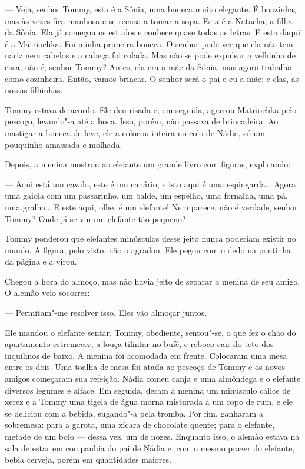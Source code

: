 --- Veja, senhor Tommy, esta é a Sônia, uma boneca muito elegante. É boazinha, mas às vezes fica manhosa e se recusa a tomar a sopa.
Esta é a Natacha, a filha da Sônia. Ela já começou os estudos e conhece
quase todas as letras. E esta daqui é a Matriochka. Foi minha primeira
boneca. O senhor pode ver que ela não tem nariz nem cabelos e a cabeça
foi colada. Mas não se pode expulsar a velhinha de casa, não é, senhor Tommy? Antes, ela era a mãe da Sônia, mas agora trabalha como
cozinheira. Então, vamos brincar. O senhor será o pai e eu a mãe; e
elas, as nossas filhinhas.

Tommy estava de acordo. Ele deu risada e, em seguida, agarrou Matriochka
pelo pescoço, levando"-a até a boca. Isso, porém, não passava de
brincadeira. Ao mastigar a boneca de leve, ele a colocou inteira no colo
de Nádia, só um pouquinho amassada e molhada.

Depois, a menina mostrou ao elefante um grande livro com figuras,
explicando:

--- Aqui está um cavalo, este é um canário, e isto aqui é uma
espingarda\ldots{} Agora uma gaiola com um passarinho, um balde, um espelho,
uma fornalha, uma pá, uma gralha\ldots{} E este aqui, olhe, é um elefante!
Nem parece, não é verdade, senhor Tommy? Onde já se viu um elefante tão
pequeno?

Tommy ponderou que elefantes minúsculos desse jeito nunca poderiam existir no
mundo. A figura, pelo visto, não o agradou. Ele pegou com o dedo na
pontinha da página e a virou.

Chegou a hora do almoço, mas não havia jeito de separar a menina de seu
amigo. O alemão veio socorrer:

--- Permitam"-me resolver isso. Eles vão almoçar juntos.

Ele mandou o elefante sentar. Tommy, obediente, sentou"-se, o que fez o
chão do apartamento estremecer, a louça tilintar no bufê, e reboco cair
do teto dos inquilinos de baixo. A menina foi acomodada em frente.
Colocaram uma mesa entre os dois. Uma toalha de mesa foi atada ao
pescoço de Tommy e os novos amigos começaram sua refeição. Nádia comeu
canja e uma almôndega e o elefante diversos legumes e alface. Em
seguida, deram à menina um minúsculo cálice de xerez e a Tommy uma
tigela de água morna misturada a um copo de rum, e ele se deliciou com a
bebida, sugando"-a pela tromba. Por fim, ganharam a sobremesa: para a
garota, uma xícara de chocolate quente; para o elefante, metade de um
bolo --- dessa vez, um de nozes. Enquanto isso, o alemão estava na sala
de estar em companhia do pai de Nádia e, com o mesmo prazer do elefante,
bebia cerveja, porém em quantidades maiores.

